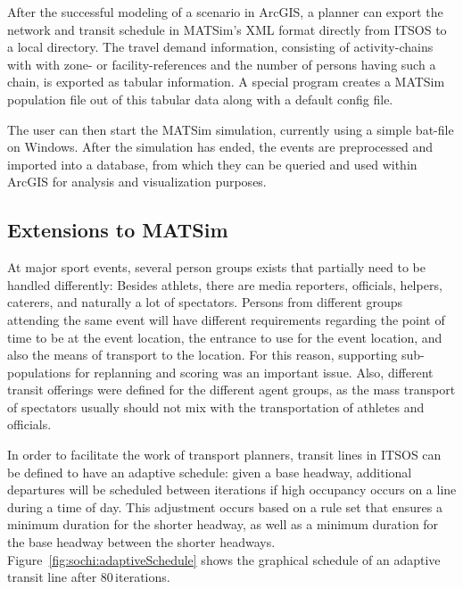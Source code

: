 After the successful modeling of a scenario in ArcGIS, a planner can export
the network and transit schedule in MATSim's XML format directly from ITSOS to a
local directory. The travel demand information, consisting of activity-chains
with with zone- or facility-references and the number of persons having such a
chain, is exported as tabular information. A special program creates a MATSim
population file out of this tabular data along with a default config file.

The user can then start the MATSim simulation, currently using a simple bat-file
on Windows. After the simulation has ended, the events are preprocessed and
imported into a database, from which they can be queried and used within ArcGIS
for analysis and visualization purposes.

\subsection{Extensions to MATSim}
At major sport events, several person groups exists that partially need to be
handled differently: Besides athlets, there are media reporters, officials,
helpers, caterers, and naturally a lot of spectators. Persons from different
groups attending the same event will have different requirements regarding the
point of time to be at the event location, the entrance to use for the event
location, and also the means of transport to the location.  For this reason,
supporting sub-populations for replanning and scoring was an important issue.
Also, different transit offerings were defined for the different agent groups,
as the mass transport of spectators usually should not mix with the
transportation of athletes and officials.

In order to facilitate the work of transport planners, transit lines in
ITSOS can be defined to have an adaptive schedule: given a base headway,
additional departures will be scheduled between iterations if high
occupancy occurs on a line during a time of day. This adjustment occurs based
on a rule set that ensures a minimum duration for the shorter headway, as well
as a minimum duration for the base headway between the shorter headways.
Figure~\ref{fig:sochi:adaptiveSchedule} shows the graphical schedule of an
adaptive transit line after 80\,iterations.

